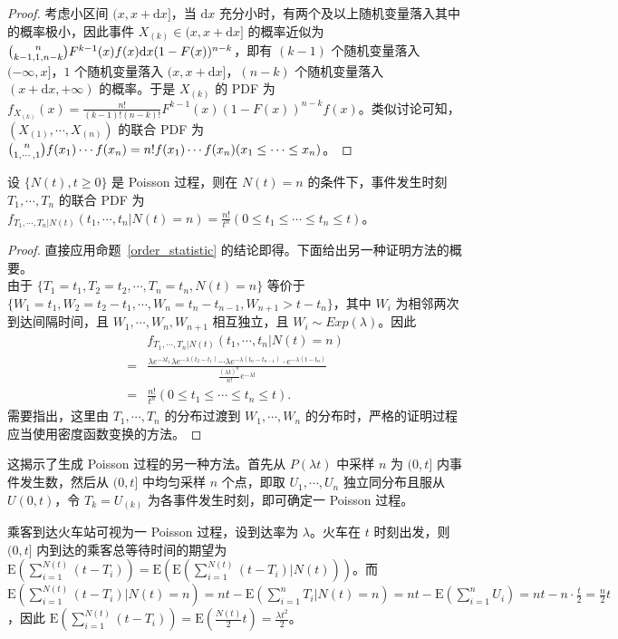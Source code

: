 \documentclass[../main.tex]{subfiles}
\begin{document}
\begin{proof}
    考虑小区间 $(x,x+\mathrm dx]$，当 $\mathrm dx$ 充分小时，有两个及以上随机变量落入其中的概率极小，因此事件 $X_{(k)}\in(x,x+\mathrm dx]$ 的概率近似为 $\tbinom{n}{k-1,1,n-k}F^{k-1}(x)f(x)\mathrm dx(1-F(x))^{n-k}$，即有 $(k-1)$ 个随机变量落入 $(-\infty,x]$，$1$ 个随机变量落入 $(x,x+\mathrm dx]$，$(n-k)$ 个随机变量落入 $(x+\mathrm dx,+\infty)$ 的概率。于是 $X_{(k)}$ 的 PDF 为 $f_{X_{(k)}}(x)=\frac{n!}{(k-1)!(n-k)!}F^{k-1}(x)(1-F(x))^{n-k}f(x)$。类似讨论可知，$(X_{(1)},\cdots,X_{(n)})$ 的联合 PDF 为 $\tbinom{n}{1,\cdots,1}f(x_1)\cdots f(x_n)=n!f(x_1)\cdots f(x_n)(x_1\leq\cdots\leq x_n)$。
\end{proof}

\begin{theorem}\label{thm:6.3.5}
    设 $\{N(t),t\geq0\}$ 是 Poisson 过程，则在 $N(t)=n$ 的条件下，事件发生时刻 $T_1,\cdots,T_n$ 的联合 PDF 为 $f_{T_1,\cdots,T_n|N(t)}(t_1,\cdots,t_n|N(t)=n)=\frac{n!}{t^n}(0\leq t_1\leq\cdots\leq t_n\leq t)$。
\end{theorem}

\begin{proof}
    直接应用命题~\ref{order_statistic} 的结论即得。下面给出另一种证明方法的概要。\\
    由于 $\{T_1=t_1,T_2=t_2,\cdots,T_n=t_n,N(t)=n\}$ 等价于 $\{W_1=t_1,W_2=t_2-t_1,\cdots,W_n=t_n-t_{n-1},W_{n+1}>t-t_n\}$，其中 $W_i$ 为相邻两次到达间隔时间，且 $W_1,\cdots,W_n,W_{n+1}$ 相互独立，且 $W_i\sim Exp(\lambda)$。因此
    \begin{equation*}
        \begin{aligned}
              & f_{T_1,\cdots,T_n|N(t)}(t_1,\cdots,t_n|N(t)=n)                                                                                                                       \\
            = & \frac{\lambda e^{-\lambda t_1}\lambda e^{-\lambda(t_2-t_1)}\cdots\lambda e^{-\lambda(t_n-t_{n-1})}\cdot e^{-\lambda(t-t_n)}}{\frac{(\lambda t)^n}{n!}e^{-\lambda t}} \\
            = & \frac{n!}{t^n}(0\leq t_1\leq\cdots\leq t_n\leq t).
        \end{aligned}
    \end{equation*}
    需要指出，这里由 $T_1,\cdots,T_n$ 的分布过渡到 $W_1,\cdots,W_n$ 的分布时，严格的证明过程应当使用密度函数变换的方法。
\end{proof}

这揭示了生成 Poisson 过程的另一种方法。首先从 $P(\lambda t)$ 中采样 $n$ 为 $(0,t]$ 内事件发生数，然后从 $(0,t]$ 中均匀采样 $n$ 个点，即取 $U_1,\cdots,U_n$ 独立同分布且服从 $U(0,t)$，令 $T_k=U_{(k)}$ 为各事件发生时刻，即可确定一 Poisson 过程。

\begin{example}
    乘客到达火车站可视为一 Poisson 过程，设到达率为 $\lambda$。火车在 $t$ 时刻出发，则 $(0,t]$ 内到达的乘客总等待时间的期望为 $\mathrm E(\sum_{i=1}^{N(t)}(t-T_i))=\mathrm E(\mathrm E(\sum_{i=1}^{N(t)}(t-T_i)|N(t)))$。而 $\mathrm E(\sum_{i=1}^{N(t)}(t-T_i)|N(t)=n)=nt-\mathrm E(\sum_{i=1}^nT_i|N(t)=n)=nt-\mathrm E(\sum_{i=1}^nU_i)=nt-n\cdot\frac t2=\frac n2t$，因此 $\mathrm E(\sum_{i=1}^{N(t)}(t-T_i))=\mathrm E(\frac{N(t)}2t)=\frac{\lambda t^2}2$。
\end{example}
\end{document}
